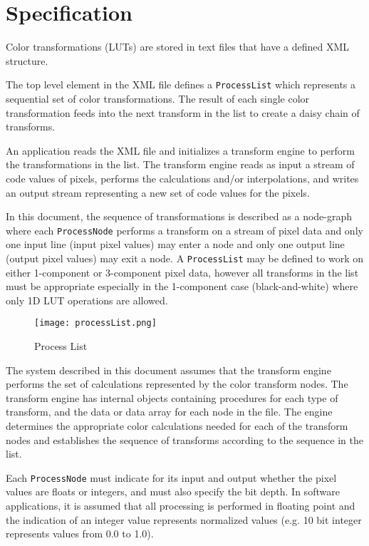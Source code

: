 \regularsectionformat
\chapter{Specification}
\label{sec:specification}

Color transformations (LUTs) are stored in text files that have a defined XML structure.

The top level element in the XML file defines a \texttt{ProcessList} which represents a sequential set of color transformations. The result of each single color transformation feeds into the next transform in the list to create a daisy chain of transforms.

An application reads the XML file and initializes a transform engine to perform the transformations in the list. The transform engine reads as input a stream of code values of pixels, performs the calculations and/or interpolations, and writes an output stream representing a new set of code values for the pixels.  

In this document, the sequence of transformations is described as a node-graph where each \texttt{ProcessNode} performs a transform on a stream of pixel data and only one input line (input pixel values) may enter a node and only one output line (output pixel values) may exit a node. A \texttt{ProcessList} may be defined to work on either 1-component or 3-component pixel data, however all transforms in the list must be appropriate especially in the 1-component case (black-and-white) where only 1D LUT operations are allowed.
 
\begin{figure}[htbp]
\begin{center}
    \texttt{[image: processList.png]}
\caption{Process List}
\label{fig:lmt}
\end{center}
\end{figure}

The system described in this document assumes that the transform engine performs the set of calculations represented by the color transform nodes. The transform engine has internal objects containing procedures for each type of transform, and the data or data array for each node in the file. The engine determines the appropriate color calculations needed for each of the transform nodes and establishes the sequence of transforms according to the sequence in the list.

Each \texttt{ProcessNode} must indicate for its input and output whether the pixel values are floats or integers, and must also specify the bit depth. In software applications, it is assumed that all processing is performed in floating point and the indication of an integer value represents normalized values (e.g. 10 bit integer represents values from 0.0 to 1.0).

